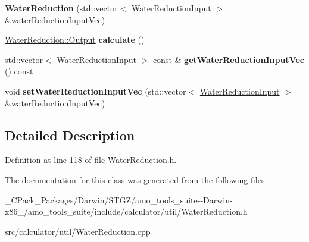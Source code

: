 \begin{DoxyCompactItemize}
\item 
\mbox{\label{class_water_reduction_a51ac64467b3fd5dbb4a1f916a3d61b84}} 
{\bfseries Water\+Reduction} (std\+::vector$<$ \hyperlink{class_water_reduction_input}{Water\+Reduction\+Input} $>$ \&water\+Reduction\+Input\+Vec)
\item 
\mbox{\label{class_water_reduction_a24453d098797a0b1a1f69836abff4281}} 
\hyperlink{struct_water_reduction_1_1_output}{Water\+Reduction\+::\+Output} {\bfseries calculate} ()
\item 
\mbox{\label{class_water_reduction_ac2c0497b047722a30db004d460f7520d}} 
std\+::vector$<$ \hyperlink{class_water_reduction_input}{Water\+Reduction\+Input} $>$ const  \& {\bfseries get\+Water\+Reduction\+Input\+Vec} () const
\item 
\mbox{\label{class_water_reduction_a29b38ac42b6c9145e0765818bb8f5924}} 
void {\bfseries set\+Water\+Reduction\+Input\+Vec} (std\+::vector$<$ \hyperlink{class_water_reduction_input}{Water\+Reduction\+Input} $>$ \&water\+Reduction\+Input\+Vec)
\end{DoxyCompactItemize}


\subsection{Detailed Description}


Definition at line 118 of file Water\+Reduction.\+h.



The documentation for this class was generated from the following files\+:\begin{DoxyCompactItemize}
\item 
\+\_\+\+C\+Pack\+\_\+\+Packages/\+Darwin/\+S\+T\+G\+Z/amo\+\_\+tools\+\_\+suite-\/-\/\+Darwin-\/x86\+\_/amo\+\_\+tools\+\_\+suite/include/calculator/util/Water\+Reduction.\+h\item 
src/calculator/util/Water\+Reduction.\+cpp\end{DoxyCompactItemize}
